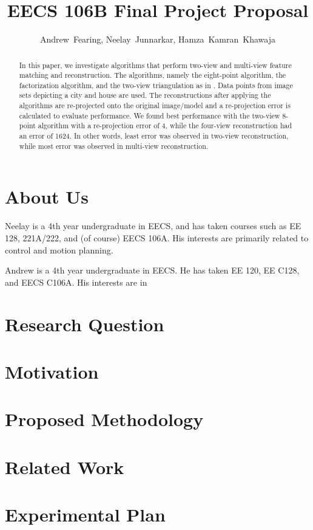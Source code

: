 \documentclass[journal]{IEEEtran}
\begin{document}
\title{EECS 106B Final Project Proposal}
\author{Andrew~Fearing, Neelay~Junnarkar,  Hamza~Kamran~Khawaja}
\maketitle




\begin{abstract} In this paper, we investigate algorithms that perform two-view and multi-view feature matching and reconstruction. The algorithms, namely the eight-point algorithm, the factorization algorithm, and the two-view triangulation as in \cite{ma2012invitation}. Data points from image sets depicting a city and house are used. The reconstructions after applying the algorithms are re-projected onto the original image/model and a re-projection error is calculated to evaluate performance. We found best performance with the two-view 8-point algorithm with a re-projection error of 4, while the four-view reconstruction had an error of 1624. In other words, least error was observed in two-view reconstruction, while most error was observed in multi-view reconstruction.
\end{abstract}


\section{About Us}
Neelay is a 4th year undergraduate in EECS, and has taken courses such as EE 128, 221A/222, and (of course) EECS 106A. His interests are primarily related to control and motion planning.

Andrew is a 4th year undergraduate in EECS. He has taken EE 120, EE C128, and EECS C106A. His interests are in 
\section{Research Question}

\section{Motivation}

\section{Proposed Methodology}

\section{Related Work}

\section{Experimental Plan}
\end{document}
